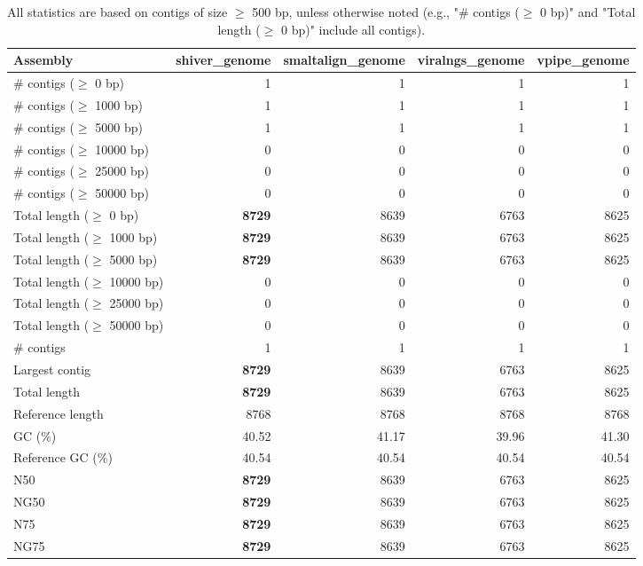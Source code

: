 \documentclass[12pt,a4paper]{article}
\begin{document}
\begin{table}[ht]
\begin{center}
\caption{All statistics are based on contigs of size $\geq$ 500 bp, unless otherwise noted (e.g., "\# contigs ($\geq$ 0 bp)" and "Total length ($\geq$ 0 bp)" include all contigs).}
\begin{tabular}{|l*{4}{|r}|}
\hline
Assembly & shiver\_genome & smaltalign\_genome & viralngs\_genome & vpipe\_genome \\ \hline
\# contigs ($\geq$ 0 bp) & 1 & 1 & 1 & 1 \\ \hline
\# contigs ($\geq$ 1000 bp) & 1 & 1 & 1 & 1 \\ \hline
\# contigs ($\geq$ 5000 bp) & 1 & 1 & 1 & 1 \\ \hline
\# contigs ($\geq$ 10000 bp) & 0 & 0 & 0 & 0 \\ \hline
\# contigs ($\geq$ 25000 bp) & 0 & 0 & 0 & 0 \\ \hline
\# contigs ($\geq$ 50000 bp) & 0 & 0 & 0 & 0 \\ \hline
Total length ($\geq$ 0 bp) & {\bf 8729} & 8639 & 6763 & 8625 \\ \hline
Total length ($\geq$ 1000 bp) & {\bf 8729} & 8639 & 6763 & 8625 \\ \hline
Total length ($\geq$ 5000 bp) & {\bf 8729} & 8639 & 6763 & 8625 \\ \hline
Total length ($\geq$ 10000 bp) & 0 & 0 & 0 & 0 \\ \hline
Total length ($\geq$ 25000 bp) & 0 & 0 & 0 & 0 \\ \hline
Total length ($\geq$ 50000 bp) & 0 & 0 & 0 & 0 \\ \hline
\# contigs & 1 & 1 & 1 & 1 \\ \hline
Largest contig & {\bf 8729} & 8639 & 6763 & 8625 \\ \hline
Total length & {\bf 8729} & 8639 & 6763 & 8625 \\ \hline
Reference length & 8768 & 8768 & 8768 & 8768 \\ \hline
GC (\%) & 40.52 & 41.17 & 39.96 & 41.30 \\ \hline
Reference GC (\%) & 40.54 & 40.54 & 40.54 & 40.54 \\ \hline
N50 & {\bf 8729} & 8639 & 6763 & 8625 \\ \hline
NG50 & {\bf 8729} & 8639 & 6763 & 8625 \\ \hline
N75 & {\bf 8729} & 8639 & 6763 & 8625 \\ \hline
NG75 & {\bf 8729} & 8639 & 6763 & 8625 \\ \hline

\end{tabular}
\end{center}
\end{table}
\end{document}
